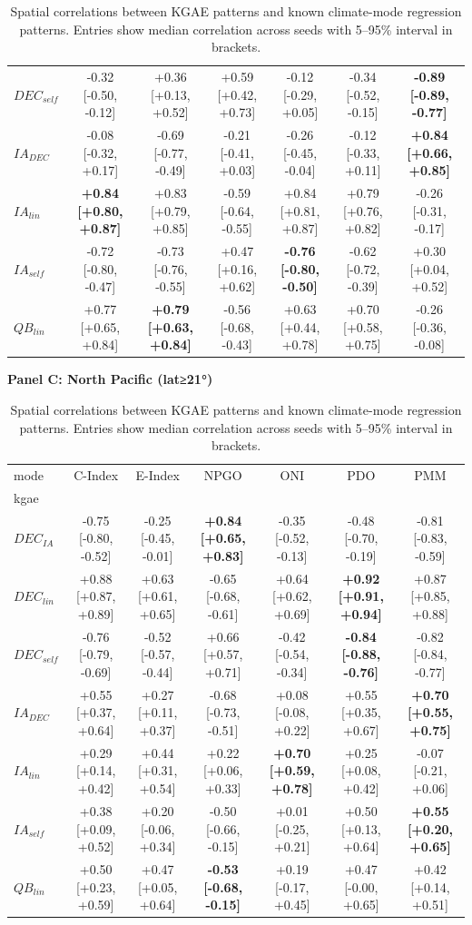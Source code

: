 \begin{table}[t]
\begin{tabular}{lcccccc}
$DEC_{self}$ & -0.32 [-0.50, -0.12] & +0.36 [+0.13, +0.52] & +0.59 [+0.42, +0.73] & -0.12 [-0.29, +0.05] & -0.34 [-0.52, -0.15] & \textbf{-0.89 [-0.89, -0.77]} \\
$IA_{DEC}$ & -0.08 [-0.32, +0.17] & -0.69 [-0.77, -0.49] & -0.21 [-0.41, +0.03] & -0.26 [-0.45, -0.04] & -0.12 [-0.33, +0.11] & \textbf{+0.84 [+0.66, +0.85]} \\
$IA_{lin}$ & \textbf{+0.84 [+0.80, +0.87]} & +0.83 [+0.79, +0.85] & -0.59 [-0.64, -0.55] & +0.84 [+0.81, +0.87] & +0.79 [+0.76, +0.82] & -0.26 [-0.31, -0.17] \\
$IA_{self}$ & -0.72 [-0.80, -0.47] & -0.73 [-0.76, -0.55] & +0.47 [+0.16, +0.62] & \textbf{-0.76 [-0.80, -0.50]} & -0.62 [-0.72, -0.39] & +0.30 [+0.04, +0.52] \\
$QB_{lin}$ & +0.77 [+0.65, +0.84] & \textbf{+0.79 [+0.63, +0.84]} & -0.56 [-0.68, -0.43] & +0.63 [+0.44, +0.78] & +0.70 [+0.58, +0.75] & -0.26 [-0.36, -0.08] \\
\bottomrule
\end{tabular}
\vspace{0.6em}
\textbf{Panel C: North Pacific (lat≥21°)}\\
\begin{tabular}{lcccccc}
\toprule
mode & C-Index & E-Index & NPGO & ONI & PDO & PMM \\
kgae &  &  &  &  &  &  \\
\midrule
$DEC_{IA}$ & -0.75 [-0.80, -0.52] & -0.25 [-0.45, -0.01] & \textbf{+0.84 [+0.65, +0.83]} & -0.35 [-0.52, -0.13] & -0.48 [-0.70, -0.19] & -0.81 [-0.83, -0.59] \\
$DEC_{lin}$ & +0.88 [+0.87, +0.89] & +0.63 [+0.61, +0.65] & -0.65 [-0.68, -0.61] & +0.64 [+0.62, +0.69] & \textbf{+0.92 [+0.91, +0.94]} & +0.87 [+0.85, +0.88] \\
$DEC_{self}$ & -0.76 [-0.79, -0.69] & -0.52 [-0.57, -0.44] & +0.66 [+0.57, +0.71] & -0.42 [-0.54, -0.34] & \textbf{-0.84 [-0.88, -0.76]} & -0.82 [-0.84, -0.77] \\
$IA_{DEC}$ & +0.55 [+0.37, +0.64] & +0.27 [+0.11, +0.37] & -0.68 [-0.73, -0.51] & +0.08 [-0.08, +0.22] & +0.55 [+0.35, +0.67] & \textbf{+0.70 [+0.55, +0.75]} \\
$IA_{lin}$ & +0.29 [+0.14, +0.42] & +0.44 [+0.31, +0.54] & +0.22 [+0.06, +0.33] & \textbf{+0.70 [+0.59, +0.78]} & +0.25 [+0.08, +0.42] & -0.07 [-0.21, +0.06] \\
$IA_{self}$ & +0.38 [+0.09, +0.52] & +0.20 [-0.06, +0.34] & -0.50 [-0.66, -0.15] & +0.01 [-0.25, +0.21] & +0.50 [+0.13, +0.64] & \textbf{+0.55 [+0.20, +0.65]} \\
$QB_{lin}$ & +0.50 [+0.23, +0.59] & +0.47 [+0.05, +0.64] & \textbf{-0.53 [-0.68, -0.15]} & +0.19 [-0.17, +0.45] & +0.47 [-0.00, +0.65] & +0.42 [+0.14, +0.51] \\
\bottomrule
\end{tabular}
\vspace{0.6em}
\caption{Spatial correlations between KGAE patterns and known climate-mode regression patterns. Entries show median correlation across seeds with 5--95\% interval in brackets.}
\label{tab:kgae_climate_panels}
\end{table}